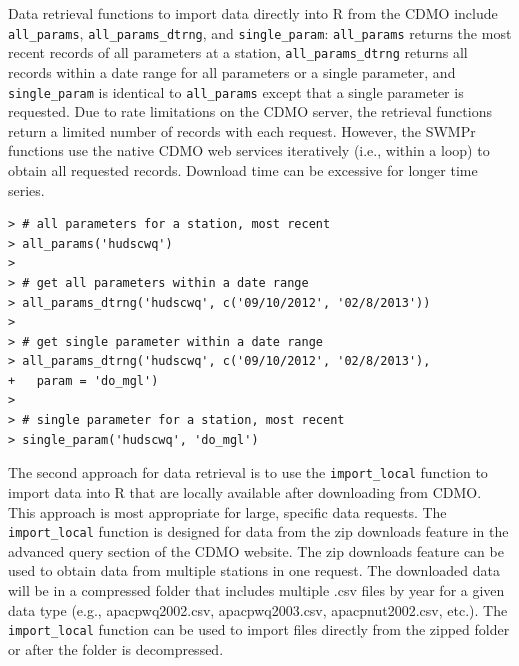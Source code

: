 \documentclass[10pt,letterpaper]{article}\usepackage[]{graphicx}\usepackage[]{color}
\makeatletter
\newenvironment{kframe}{%
 \def\at@end@of@kframe{}%
 \ifinner\ifhmode%
  \def\at@end@of@kframe{\end{minipage}}%
  \begin{minipage}{\columnwidth}%
 \fi\fi%
 \def\FrameCommand##1{\hskip\@totalleftmargin \hskip-\fboxsep
 \colorbox{shadecolor}{##1}\hskip-\fboxsep
     \hskip-\linewidth \hskip-\@totalleftmargin \hskip\columnwidth}%
 \MakeFramed {\advance\hsize-\width
   \@totalleftmargin\z@ \linewidth\hsize
   \@setminipage}}%
 {\par\unskip\endMakeFramed%
 \at@end@of@kframe}
\newenvironment{knitrout}{}{} %
\makeatother
\begin{document}
Data retrieval functions to import data directly into R from the \gls{CDMO} include \texttt{all\_params}, \texttt{all\_params\_dtrng}, and \texttt{single\_param}: \texttt{all\_params} returns the most recent records of all parameters at a station, \texttt{all\_params\_dtrng} returns all records within a date range for all parameters or a single parameter, and \texttt{single\_param} is identical to \texttt{all\_params} except that a single parameter is requested. Due to rate limitations on the \gls{CDMO} server, the retrieval functions return a limited number of records with each request.  However, the SWMPr functions use the native CDMO web services iteratively (i.e., within a loop) to obtain all requested records.  Download time can be excessive for longer time series.     

\begin{knitrout}\small
{}\color{fgcolor}\begin{kframe}
\begin{verbatim}
> # all parameters for a station, most recent
> all_params('hudscwq')
> 
> # get all parameters within a date range
> all_params_dtrng('hudscwq', c('09/10/2012', '02/8/2013'))
> 
> # get single parameter within a date range
> all_params_dtrng('hudscwq', c('09/10/2012', '02/8/2013'), 
+   param = 'do_mgl')
> 
> # single parameter for a station, most recent
> single_param('hudscwq', 'do_mgl')
\end{verbatim}
\end{kframe}
\end{knitrout}

The second approach for data retrieval is to use the \texttt{import\_local} function to import data into R that are locally available after downloading from \gls{CDMO}.  This approach is most appropriate for large, specific data requests. The \texttt{import\_local} function is designed for data from the zip downloads feature in the advanced query section of the \gls{CDMO} website. The zip downloads feature can be used to obtain data from multiple stations in one request.  The downloaded data will be in a compressed folder that includes multiple .csv files by year for a given data type (e.g., apacpwq2002.csv, apacpwq2003.csv, apacpnut2002.csv, etc.).  The \texttt{import\_local} function can be used to import files directly from the zipped folder or after the folder is decompressed.
\end{document}
